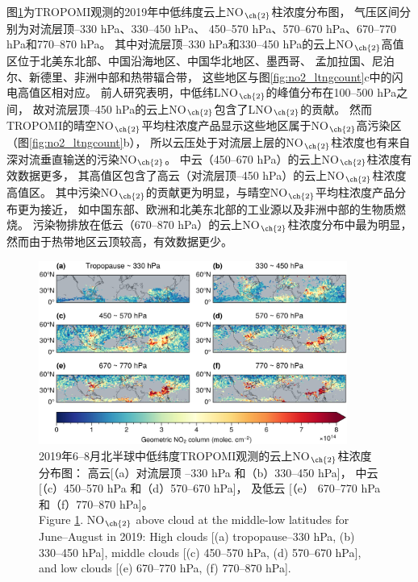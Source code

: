图\ref{fig:no2geo_tropomi}为TROPOMI观测的2019年中低纬度云上NO$_{\ch{2}}$柱浓度分布图，
气压区间分别为对流层顶--330 hPa、330--450 hPa、
450--570 hPa、570--670 hPa、670--770 hPa和770--870 hPa。
其中对流层顶--330 hPa和330--450 hPa的云上NO$_{\ch{2}}$高值区位于北美东北部、中国沿海地区、中国华北地区、墨西哥、
孟加拉国、尼泊尔、新德里、非洲中部和热带辐合带，
这些地区与图\ref{fig:no2_ltngcount}c中的闪电高值区相对应。
前人研究表明，中低纬LNO$_{\ch{2}}$的峰值分布在100--500 hPa之间\citep{Pickering.1988,Ott.2010,Luo.2017}，
故对流层顶--450 hPa的云上NO$_{\ch{2}}$包含了LNO$_{\ch{2}}$的贡献。
然而TROPOMI的晴空NO$_{\ch{2}}$平均柱浓度产品显示这些地区属于NO$_{\ch{2}}$高污染区（图\ref{fig:no2_ltngcount}b），
所以云压处于对流层上层的NO$_{\ch{2}}$柱浓度也有来自深对流垂直输送的污染NO$_{\ch{2}}$。
中云（450--670 hPa）的云上NO$_{\ch{2}}$柱浓度有效数据更多，
其高值区包含了高云（对流层顶--450 hPa）的云上NO$_{\ch{2}}$柱浓度高值区。
其中污染NO$_{\ch{2}}$的贡献更为明显，与晴空NO$_{\ch{2}}$平均柱浓度产品分布更为接近，
如中国东部、欧洲和北美东北部的工业源以及非洲中部的生物质燃烧。
污染物排放在低云（670--870 hPa）的云上NO$_{\ch{2}}$柱浓度分布中最为明显，然而由于热带地区云顶较高，有效数据更少。



\begin{figure}[H]
    \centering
    \includegraphics[width=0.9\textwidth]{./figures/no2geo_tropomi.png}
    \caption{
    2019年6--8月北半球中低纬度TROPOMI观测的云上NO$_{\ch{2}}$柱浓度分布图：
    高云[（a）对流层顶 --330 hPa 和（b）330--450 hPa]，
    中云 [（c）450--570 hPa 和（d）570--670 hPa]，
    及低云 [（e） 670--770 hPa 和（f）770--870 hPa]。 \\
    Figure \ref{fig:no2geo_tropomi}. NO$_{\ch{2}}$ above cloud at the middle-low latitudes for June--August in 2019:
    High clouds [(a) tropopause--330 hPa, (b) 330--450 hPa],
    middle clouds [(c) 450--570 hPa, (d) 570--670 hPa],
    and low clouds [(e) 670--770 hPa, (f) 770--870 hPa].
    }
    \label{fig:no2geo_tropomi}
\end{figure}

